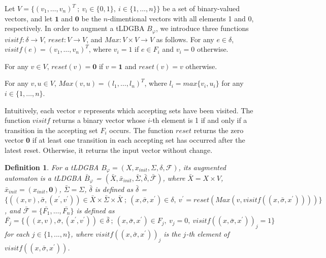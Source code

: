 \documentclass[letterpaper, 10 pt, conference]{ieeeconf}  %
\newtheorem{definition}{Definition}
\begin{document}
Let $V = \{ (v_1, \ldots ,v_n)^T\ ;\ v_i \in \{ 0,1 \},\ i \in \{ 1, \ldots ,n \} \}$ be a set of binary-valued vectors, and let $\bm{1}$ and $\bm{0}$ be the $n$-dimentional vectors with all elements 1 and 0, respectively.
In order to augment a tLDGBA $B_{\varphi}$, we introduce three functions $visitf:\delta \rightarrow V$, $reset:V \rightarrow V$, and $Max:V\times V \rightarrow V$ as follows.
For any $e \in \delta$, $visitf(e) = (v_1, \ldots ,v_n)^T$, where $ v_i = 1 $ if $ e \in F_i $ and $ v_i=0 $ otherwise.

For any $v \in V$, $ reset(v) = \bm{0} $ if $ v = \bm{1} $ and $ reset(v) = v $ otherwise.

For any $v,u \in V$, $Max(v,u) = (l_1,\ldots ,l_n)^T$, where $l_i = max\{v_i, u_i\} $ for any $i\in \{1, \ldots ,n\}$.

Intuitively, each vector $v$ represents which accepting sets have been visited. The function $visitf$ returns a binary vector whose $i$-th element is 1 if and only if a transition in the accepting set $F_i$ occurs. The function $reset$ returns the zero vector $\bm{0}$ if at least one transition in each accepting set has occurred after the latest reset. Otherwise, it returns the input vector without change.

\begin{definition}
   For a tLDGBA $B_{\varphi} = (X,x_{init},\Sigma,\delta,\mathcal{F})$, its augmented automaton is a tLDGBA $\bar{B}_{\varphi}$ = $(\bar{X},\bar{x}_{init},\bar{\Sigma},\bar{\delta},\bar{\mathcal{F}})$, where $\bar{X} = X\times V$, $\bar{x}_{init} = (x_{init}, \bm{0})$, $\bar{\Sigma} = \Sigma$, $\bar{\delta}$ is defined as $\bar{\delta}$ = $\{ ((x,v), \bar{\sigma}, (x^{\prime},v^{\prime})) \in \bar{X} \times \bar{\Sigma} \times \bar{X}\ ;\ (x,\bar{\sigma},x^{\prime}) \in \delta,\ v^{\prime} = reset(Max(v,visitf((x,\bar{\sigma},x^{\prime})))) \}$, and $\mathcal{\bar{F}} = \{ \bar{F_1}, \ldots ,\bar{F_n} \}$ is defined as $\bar{F_j} = \{ ((x,v), \bar{\sigma}, (x^{\prime},v^{\prime})) \in \bar{\delta}\ ;\ (x, \bar{\sigma}, x^{\prime}) \in F_j,\ v_j = 0,\ visitf((x, \bar{\sigma}, x^{\prime}))_j = 1\}$ for each $ j \in \{1,...,n\}$, where $visitf((x, \bar{\sigma}, x^{\prime}))_j$ is the $j$-th element of $visitf((x, \bar{\sigma}, x^{\prime}))$.
\end{definition}
\end{document}
